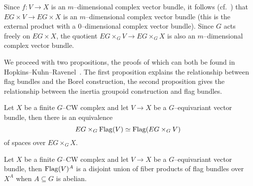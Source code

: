 Since \(f \colon V \rightarrow X\) is an \(m\)--dimensional complex vector bundle, it follows (cf.\ ) that \(EG \times V \rightarrow EG \times X\) is an \(m\)--dimensional complex vector bundle (this is the external product with a \(0\)--dimensional complex vector bundle). Since \(G\) acts freely on \(EG \times X\), the quotient \(EG \times_G V \rightarrow EG \times_G X\) is also an \(m\)--dimensional complex vector bundle.

We proceed with two propositions, the proofs of which can both be found in Hopkins--Kuhn--Ravenel~\cite[Proposition 2.6]{HKR}. The first proposition explains the relationship between flag bundles and the Borel construction, the second proposition gives the relationship between the inertia groupoid construction and flag bundles.

\begin{proposition} \label{app:orbitflags}
Let \(X\) be a finite \(G\)--CW complex and let \(V \rightarrow X\) be a \(G\)--equivariant vector bundle, then there is an equivalence
\[
EG \times_G \operatorname{Flag}(V) \simeq \operatorname{Flag}(EG \times_G V)
\]
of spaces over \(EG \times_G X\).
\end{proposition}

\begin{proposition} \label{app:inertiaflags}
Let \(X\) be a finite \(G\)--CW complex and let \(V \rightarrow X\) be a \(G\)--equivariant vector bundle, then \(\operatorname{Flag}(V)^A\) is a disjoint union of fiber products of flag bundles over \(X^A\) when \(A \subseteq G\) is abelian.
\end{proposition}

